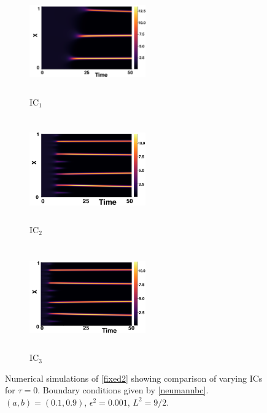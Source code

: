 \begin{figure}[H]
    \centering
    \begin{subfigure}[b]{0.32\textwidth}
        \centering
        \includegraphics[width=5cm,height=4.5cm]{gaff0.png}
        \caption{$\text{IC}_1$}
        \label{}
    \end{subfigure}
    \hfill
    \begin{subfigure}[b]{0.32\textwidth}
        \centering
        \includegraphics[width=5cm,height=4.5cm]{ic20.png}
        \caption{$\text{IC}_2$}
        \label{}
    \end{subfigure}
    \hfill
    \begin{subfigure}[b]{0.32\textwidth}
        \centering
        \includegraphics[width=5cm,height=4.5cm]{ic30.png}
        \caption{$\text{IC}_3$}
        \label{}
    \end{subfigure}
    \caption{Numerical simulations of \eqref{fixed2} showing comparison of varying ICs for $\tau=0$. Boundary conditions given by \eqref{neumannbc}. $(a,b)=(0.1,0.9)$, $\epsilon^2=0.001$, $L^2=9/2$. }
    \label{fig:figtau0}
\end{figure}
